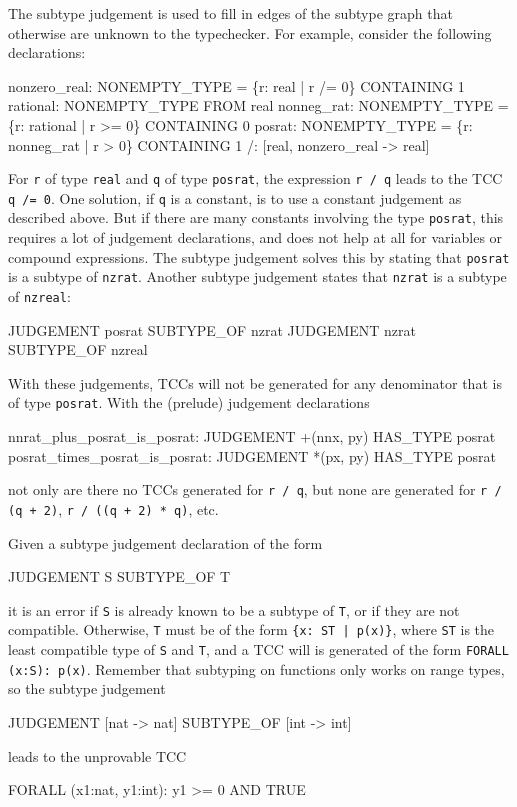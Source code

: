 The subtype judgement is used to fill in edges of the subtype graph that
otherwise are unknown to the typechecker.  For example, consider the
following declarations:
\begin{pvsex}
  nonzero_real: NONEMPTY_TYPE = \{r: real | r /= 0\} CONTAINING 1
  rational: NONEMPTY_TYPE FROM real
  nonneg_rat: NONEMPTY_TYPE = \{r: rational | r >= 0\} CONTAINING 0
  posrat: NONEMPTY_TYPE = \{r: nonneg_rat | r > 0\}  CONTAINING 1
  /: [real, nonzero_real -> real]
\end{pvsex}
For \texttt{r} of type \texttt{real} and \texttt{q} of type
\texttt{posrat}, the expression \texttt{r / q} leads to the TCC \texttt{q
/= 0}.  One solution, if \texttt{q} is a constant, is to use a constant
judgement as described above.  But if there are many constants involving
the type \texttt{posrat}, this requires a lot of judgement declarations,
and does not help at all for variables or compound expressions.  The
subtype judgement solves this by stating that \texttt{posrat} is a subtype
of \texttt{nzrat}.  Another subtype judgement states that \texttt{nzrat}
is a subtype of \texttt{nzreal}:
\begin{pvsex}
  JUDGEMENT posrat SUBTYPE_OF nzrat
  JUDGEMENT nzrat SUBTYPE_OF nzreal
\end{pvsex}
With these judgements, TCCs will not be generated for any denominator that
is of type \texttt{posrat}.  With the (prelude) judgement declarations
\begin{pvsex}
  nnrat_plus_posrat_is_posrat:   JUDGEMENT +(nnx, py) HAS_TYPE posrat
  posrat_times_posrat_is_posrat: JUDGEMENT *(px, py)  HAS_TYPE posrat
\end{pvsex}
not only are there no TCCs generated for \texttt{r / q}, but none are
generated for \texttt{r / (q + 2)}, \texttt{r / ((q + 2) * q)}, etc.

Given a subtype judgement declaration of the form
\begin{pvsex}
  JUDGEMENT S SUBTYPE_OF T
\end{pvsex}
it is an error if \texttt{S} is already known to be a subtype of
\texttt{T}, or if they are not compatible.  Otherwise, \texttt{T} must be
of the form \texttt{\{x:\ ST | p(x)\}}, where \texttt{ST} is the least
compatible type of \texttt{S} and \texttt{T}, and a TCC will is generated
of the form \texttt{FORALL (x:S): p(x)}.  Remember that subtyping on
functions only works on range types, so the subtype judgement
\begin{pvsex}
  JUDGEMENT [nat -> nat] SUBTYPE_OF [int -> int]
\end{pvsex}
leads to the unprovable TCC
\begin{pvsex}
FORALL (x1:nat, y1:int): y1 >= 0 AND TRUE
\end{pvsex}

